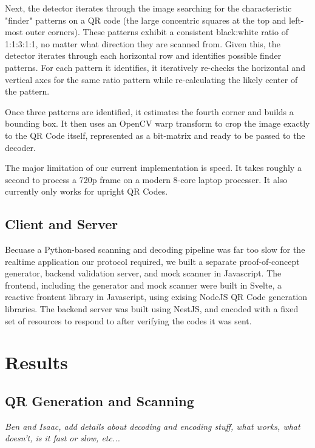 \documentclass[10pt,twocolumn,letterpaper]{article}
\begin{document}
Next, the detector iterates through the image searching for the characteristic "finder" patterns on a QR code (the large concentric squares at the top and left-most outer corners). These patterns exhibit a consistent black:white ratio of 1:1:3:1:1, no matter what direction they are scanned from. Given this, the detector iterates through each horizontal row and identifies possible finder patterns. For each pattern it identifies, it iteratively re-checks the horizontal and vertical axes for the same ratio pattern while re-calculating the likely center of the pattern. 

Once three patterns are identified, it estimates the fourth corner and builds a bounding box. It then uses an OpenCV warp transform to crop the image exactly to the QR Code itself, represented as a bit-matrix and ready to be passed to the decoder.

The major limitation of our current implementation is speed. It takes roughly a second to process a 720p frame on a modern 8-core laptop processer. It also currently only works for upright QR Codes.

\subsection{Client and Server}

Becuase a Python-based scanning and decoding pipeline was far too slow for the realtime application our protocol required, we built a separate proof-of-concept generator, backend validation server, and mock scanner in Javascript. The frontend, including the generator and mock scanner were built in Svelte, a reactive frontent library in Javascript, using exising NodeJS QR Code generation libraries. The backend server was built using NestJS, and encoded with a fixed set of resources to respond to after verifying the codes it was sent.


\section{Results}

\subsection{QR Generation and Scanning}

\textit{Ben and Isaac, add details about decoding and encoding stuff, what works, what doesn't, is it fast or slow, etc...}
\end{document}
